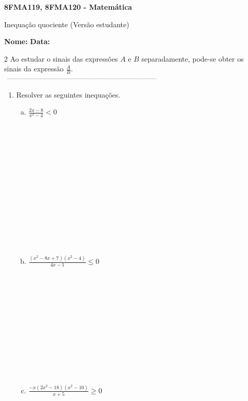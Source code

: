 \documentclass[a4paper,14pt]{article}
\begin{document}
	
	\noindent\textbf{8FMA119, 8FMA120 - Matemática} 
	
	\begin{center}Inequação quociente (Versão estudante)
	\end{center}
	
	\noindent\textbf{Nome:} \underline{\hspace{10cm}}
	\noindent\textbf{Data:} \underline{\hspace{4cm}}
	
    \begin{multicols}{2}
    	\noindent Ao estudar o sinais das expressões $A$ e $B$ separadamente, pode-se obter os sinais da expressão $\frac{A}{B}$. \\
    	\noindent\textsubscript{~---------------------------------------------------------------------------}
    	\begin{enumerate}
    		\item Resolver as seguintes inequações.
    		\begin{enumerate}[a)]
    			\item $\frac{2x - 8}{x^2 - 4} < 0$ \\\\\\\\\\\\\\\\\\\\\\\\\\\\
    			\item $\frac{(x^2 - 8x + 7)(x^2 - 4)}{4x - 1} \leq 0$ \\\\\\\\\\\\\\\\\\\\\\\\
    			\item $\frac{-x(2x^2 - 18)(x^2 - 10)}{x + 5} \geq 0$ \\\\\\\\\\\\\\\\\\\\

\end{enumerate}
\end{enumerate}
\end{multicols}
\end{document}
